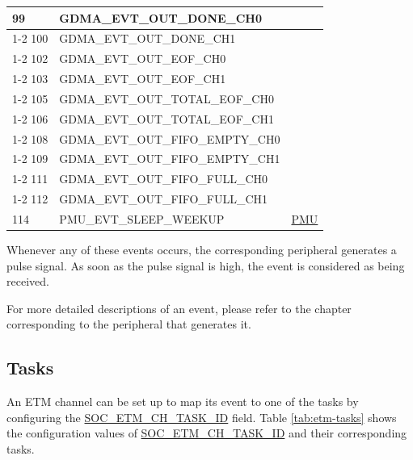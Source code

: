 \documentclass[main\_\_EN.tex]{subfiles}
\begin{document}
\begin{longtable}{ | l | l | l | }
99 & GDMA\_EVT\_OUT\_DONE\_CH0 & \\ \cline{1-2}
100 & GDMA\_EVT\_OUT\_DONE\_CH1 & \\ \cline{1-2}
102 & GDMA\_EVT\_OUT\_EOF\_CH0  & \\ \cline{1-2}
103 & GDMA\_EVT\_OUT\_EOF\_CH1  & \\ \cline{1-2}
105 & GDMA\_EVT\_OUT\_TOTAL\_EOF\_CH0  & \\ \cline{1-2}
106 & GDMA\_EVT\_OUT\_TOTAL\_EOF\_CH1  & \\ \cline{1-2}
108 & GDMA\_EVT\_OUT\_FIFO\_EMPTY\_CH0 & \\ \cline{1-2}
109 & GDMA\_EVT\_OUT\_FIFO\_EMPTY\_CH1 & \\ \cline{1-2}
111 & GDMA\_EVT\_OUT\_FIFO\_FULL\_CH0  & \\ \cline{1-2}
112 & GDMA\_EVT\_OUT\_FIFO\_FULL\_CH1  & \\ \hline
114 & PMU\_EVT\_SLEEP\_WEEKUP   & \hyperref[mod:lowpowm]{PMU} \\ \hline
\end{longtable}


Whenever any of these events occurs, the corresponding peripheral generates a pulse signal. As soon as the pulse signal is high, the event is considered as being received.

For more detailed descriptions of an event, please refer to the chapter corresponding to the peripheral that generates it.


\subsection{Tasks}
\label{sec:evntaskmatrix-tasks}
An ETM channel can be set up to map its event to one of the tasks by configuring the \hyperref[fielddesc:SOCETMCH0TASKID]{SOC\_ETM\_CH\_TASK\_ID} field. Table \ref{tab:etm-tasks} shows the configuration values of \hyperref[fielddesc:SOCETMCH0TASKID]{SOC\_ETM\_CH\_TASK\_ID} and their corresponding tasks.
\end{document}
